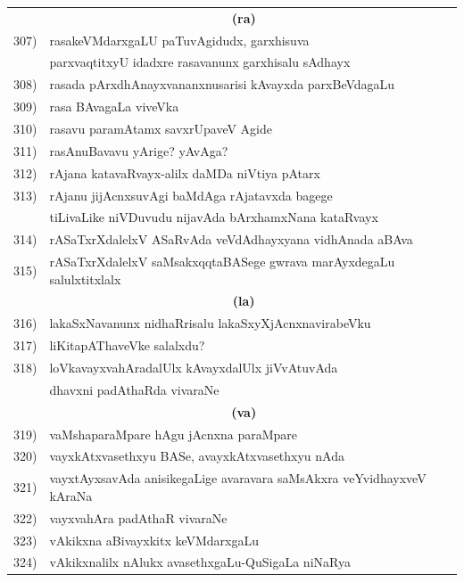 {\begin{longtable}{@{}cp{7.4cm}r}
     & \multicolumn{1}{c}{\textbf{(ra)}} & \\[0.3cm]
307) &  rasakeVMdarxgaLU paTuvAgidudx, garxhisuva & \\
     & parxvaqtitxyU idadxre rasavanunx garxhisalu sAdhayx & \pageref{page222}\\         
308) & rasada pArxdhAnayxvananxnusarisi kAvayxda parxBeVdagaLu & \pageref{page240}\\
309) & rasa BAvagaLa viveVka    & \pageref{page224}\\ 
310) & rasavu paramAtamx savxrUpaveV Agide & \pageref{page222}\\
311) & rasAnuBavavu yArige? yAvAga? &\pageref{page227}\\
312) & rAjana katavaRvayx-alilx daMDa niVtiya pAtarx &\pageref{page92}\\
313) & rAjanu jijAcnxsuvAgi baMdAga rAjatavxda bagege  & \\
     & tiLivaLike niVDuvudu nijavAda bArxhamxNana kataRvayx &\pageref{page253}\\ 
314) & rASaTxrXdalelxV ASaRvAda veVdAdhayxyana vidhAnada aBAva & \pageref{page47}\\
315) & rASaTxrXdalelxV saMsakxqqtaBASege gwrava marAyxdegaLu salulxtitxlalx & \pageref{page30}\\[0.3cm]
     & \multicolumn{1}{c}{\textbf{(la)}} & \\[0.3cm]
316) & lakaSxNavanunx nidhaRrisalu lakaSxyXjAcnxnavirabeVku & \pageref{page3}\\
317) & liKitapAThaveVke salalxdu? & \pageref{page123}\\
318) & loVkavayxvahAradalUlx kAvayxdalUlx jiVvAtuvAda & \\
     & dhavxni padAthaRda vivaraNe & \pageref{page235}\\[0.3cm]  
     & \multicolumn{1}{c}{\textbf{(va)}} & \\[0.3cm]
319) & vaMshaparaMpare hAgu jAcnxna paraMpare &  \pageref{page139}\\
320) & vayxkAtxvasethxyu BASe, avayxkAtxvasethxyu nAda & \pageref{page8}\\
321) & vayxtAyxsavAda anisikegaLige avaravara saMsAkxra veYvidhayxveV kAraNa & \pageref{page176}\\
322) & vayxvahAra padAthaR vivaraNe & \pageref{page23}\\  
323) & vAkikxna aBivayxkitx keVMdarxgaLu & \pageref{page8}\\
324) & vAkikxnalilx nAlukx avasethxgaLu-QuSigaLa niNaRya & \pageref{page8}\\

\end{longtable}}
